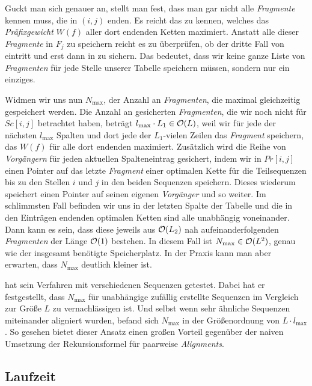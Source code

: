 Guckt man sich  genauer an, stellt man fest, dass man gar nicht alle \emph{Fragmente} kennen muss, die in $(i,j)$ enden. Es reicht das zu kennen, welches das \emph{Präfixgewicht} $W(f)$ aller dort endenden Ketten maximiert. Anstatt alle dieser \emph{Fragmente} in $F_j$ zu speichern reicht es zu überprüfen, ob der dritte Fall von  eintritt und erst dann in  zu sichern. Das bedeutet, dass wir keine ganze Liste von \emph{Fragmenten} für jede Stelle unserer Tabelle speichern müssen, sondern nur ein einziges.

Widmen wir uns nun $N_{\max}$, der Anzahl an \emph{Fragmenten}, die maximal gleichzeitig gespeichert werden. Die Anzahl an gesicherten \emph{Fragmenten}, die wir noch nicht für $Sc[i,j]$ betrachtet haben, beträgt $l_{\max} \cdot L_1 \in \mathcal{O}(L)$, weil wir für jede der nächsten $l_{\max}$ Spalten und dort jede der $L_1$-vielen Zeilen das \emph{Fragment} speichern, das $W(f)$ für alle dort endenden maximiert. Zusätzlich wird die Reihe von \emph{Vorgängern} für jeden aktuellen Spalteneintrag gesichert, indem wir in $Pr[i,j]$ einen Pointer auf das letzte \emph{Fragment} einer optimalen Kette für die Teilsequenzen bis zu den Stellen $i$ und $j$ in den beiden Sequenzen speichern. Dieses wiederum speichert einen Pointer auf seinen eigenen \emph{Vorgänger} und so weiter. Im schlimmsten Fall befinden wir uns in der letzten Spalte der Tabelle und die in den Einträgen endenden optimalen Ketten sind alle unabhängig voneinander. Dann kann es sein, dass diese jeweils aus $\mathcal{O}(L_2)$ nah aufeinanderfolgenden \emph{Fragmenten} der Länge $\mathcal{O}(1)$ bestehen. In diesem Fall ist $N_{\max} \in \mathcal{O}(L^2)$, genau wie der insgesamt benötigte Speicherplatz. In der Praxis kann man aber erwarten, dass $N_{\max}$ deutlich kleiner ist. 

\cite{m02} hat sein Verfahren mit verschiedenen Sequenzen getestet. Dabei hat er festgestellt, dass $N_{\max}$ für unabhängige zufällig erstellte Sequenzen im Vergleich zur Größe $L$ zu vernachlässigen ist. Und selbst wenn sehr ähnliche Sequenzen miteinander aligniert wurden, befand sich $N_{\max}$ in der Größenordnung von $L \cdot l_{\max}$. So gesehen bietet dieser Ansatz einen großen Vorteil gegenüber der naiven Umsetzung der Rekursionsformel für paarweise \emph{Alignments}.

\subsection{Laufzeit}

